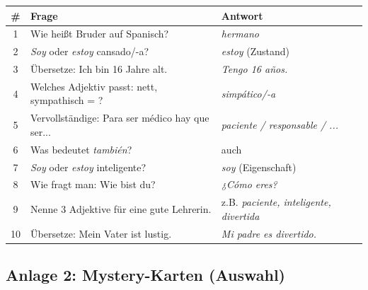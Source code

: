 \documentclass[11pt,a4paper]{article}
\begin{document}
\begin{tabular}{|c|p{7cm}|p{4.5cm}|}
\hline
\textbf{\#} & \textbf{Frage} & \textbf{Antwort} \\
\hline
1 & Wie heißt \glqq{}Bruder\grqq{} auf Spanisch? & \textit{hermano} \\
\hline
2 & \textit{Soy} oder \textit{estoy} cansado/-a? & \textit{estoy} (Zustand) \\
\hline
3 & Übersetze: \glqq{}Ich bin 16 Jahre alt.\grqq{} & \textit{Tengo 16 años.} \\
\hline
4 & Welches Adjektiv passt: nett, sympathisch = ? & \textit{simpático/-a} \\
\hline
5 & Vervollständige: Para ser médico hay que ser... & \textit{paciente / responsable / ...} \\
\hline
6 & Was bedeutet \textit{también}? & auch \\
\hline
7 & \textit{Soy} oder \textit{estoy} inteligente? & \textit{soy} (Eigenschaft) \\
\hline
8 & Wie fragt man: \glqq{}Wie bist du?\grqq{} & \textit{¿Cómo eres?} \\
\hline
9 & Nenne 3 Adjektive für eine gute Lehrerin. & z.B. \textit{paciente, inteligente, divertida} \\
\hline
10 & Übersetze: \glqq{}Mein Vater ist lustig.\grqq{} & \textit{Mi padre es divertido.} \\
\hline
\end{tabular}

\subsection{Anlage 2: Mystery-Karten (Auswahl)}
\end{document}
